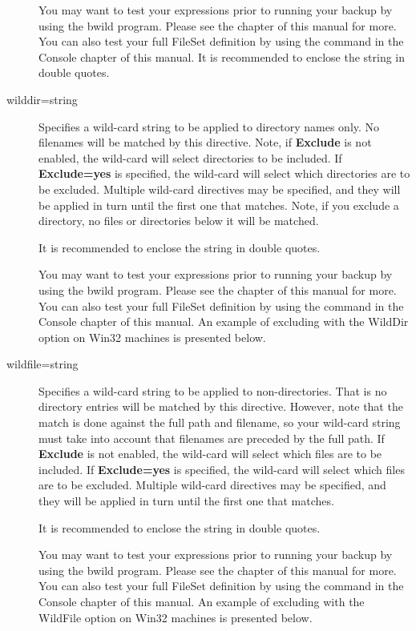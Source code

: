 \begin{description}
   You may want to test your expressions prior to running your
   backup by using the bwild program. Please see the
    chapter of this manual for
   more. You can also test your full FileSet definition by using
   the  command in the Console        
   chapter of this manual.
   It is recommended to enclose the string in double quotes.

\item [wilddir=\lt{}string\gt{}]
   Specifies a wild-card string to be applied to directory names only.  No
   filenames will be matched by this directive.  Note, if {\bf Exclude} is
   not enabled, the wild-card will select directories to be
   included.  If {\bf Exclude=yes} is specified, the wild-card will select
   which directories are to be excluded.  Multiple wild-card directives may be
   specified, and they will be applied in turn until the first one that
   matches.  Note, if you exclude a directory, no files or directories
   below it will be matched.

   It is recommended to enclose the string in double quotes.

   You may want to test your expressions prior to running your
   backup by using the bwild program. Please see the
    chapter of this manual for
   more. You can also test your full FileSet definition by using
   the  command in the Console        
   chapter of this manual.
   An example of excluding with the WildDir option on Win32 machines is    
   presented below.

\item [wildfile=\lt{}string\gt{}]
   Specifies a wild-card string to be applied to non-directories. That
   is no directory entries will be matched by this directive.
   However, note that the match is done against the full path and filename,
   so your wild-card string must take into account that filenames
   are preceded by the full path.
   If {\bf Exclude}
   is not enabled, the wild-card will select which files are to be
   included.  If {\bf Exclude=yes} is specified, the wild-card will select
   which files are to be excluded.  Multiple wild-card directives may be
   specified, and they will be applied in turn until the first one that
   matches.

   It is recommended to enclose the string in double quotes.

   You may want to test your expressions prior to running your
   backup by using the bwild program. Please see the
    chapter of this manual for
   more. You can also test your full FileSet definition by using
   the  command in the Console        
   chapter of this manual.
   An example of excluding with the WildFile option on Win32 machines is    
   presented below.



\end{description}
